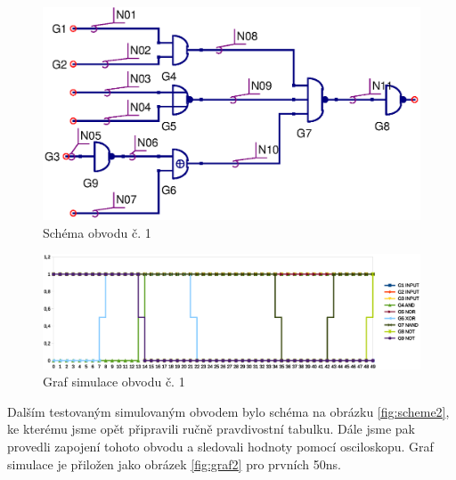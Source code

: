 \documentclass[11pt,a4paper]{article}
\begin{document}
			\begin{figure}[!htb]
				\centering
					\includegraphics[scale=.5]{input1.eps}
					\caption{Schéma obvodu č. 1}
					\label{fig:scheme1}
			\end{figure}


			\begin{figure}[!htb]
				\centering
					\includegraphics[scale=.6]{graf1.eps}
					\caption{Graf simulace obvodu č. 1}
					\label{fig:graf1}
			\end{figure}

			Dalším testovaným simulovaným obvodem bylo schéma na obrázku \ref{fig:scheme2}, ke kterému jsme opět připravili ručně pravdivostní tabulku. Dále jsme pak provedli zapojení tohoto obvodu a sledovali hodnoty pomocí osciloskopu. Graf simulace je přiložen jako obrázek \ref{fig:graf2} pro prvních 50ns.
\end{document}
